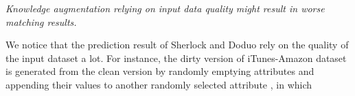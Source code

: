 \textit{Knowledge augmentation relying on input data quality might result in worse matching results.}

We notice that the prediction result of Sherlock and Doduo rely on the quality of the input dataset a lot. For instance, the dirty version of iTunes-Amazon dataset is generated from the clean version by randomly emptying attributes and appending their values to another randomly selected
attribute \cite{li_deep_2020}, in which 
